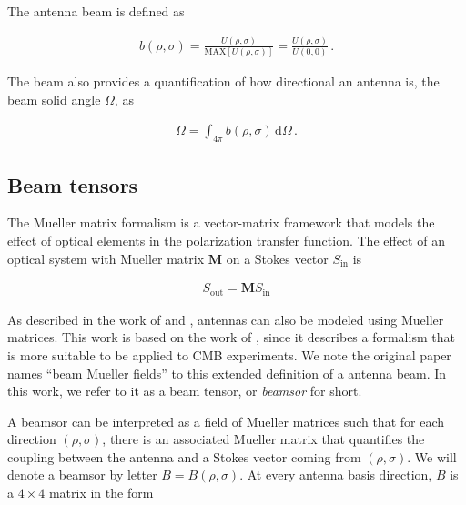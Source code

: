 \documentclass[a4paper,11pt]{article}
\begin{document}
\noindent
The antenna beam is defined as

\begin{equation}
\begin{aligned}
b(\rho, \sigma) = \frac{ U(\rho, \sigma) }{ \mathrm{MAX}\left[ U(\rho,\sigma) \right] }  =  \frac{ U(\rho, \sigma) }{ U(0,0) } \, .
\end{aligned}
\label{eq::beam_def}
\end{equation}

\noindent
The beam also provides a quantification of how directional an antenna is, the beam solid angle $\Omega$, as

\begin{equation}
\begin{aligned}
\Omega = \int_{4\pi} b(\rho,\sigma) \, \mathrm{d} \Omega \, .
\end{aligned}
\label{eq::omega_def}
\end{equation}

\subsection{Beam tensors}

The Mueller matrix formalism is a vector-matrix framework that models the effect of optical elements in the polarization transfer function. The effect of an optical system with Mueller matrix $\mathbf{M}$ on a Stokes vector $S_{\mathrm{in}}$ is 

\begin{equation}
\begin{aligned}
S_{\mathrm{out}} = \mathbf{M} S_{\mathrm{in}}
\end{aligned}
\end{equation}

\noindent
As described in the work of \cite{piepmeier_long_njoku_2008} and \cite{2007MNRAS.376.1767O}, antennas can also be modeled using Mueller matrices. This work is based on the work of \cite{2007MNRAS.376.1767O}, since it describes a formalism that is more suitable to be applied to CMB experiments. We note the original paper names ``beam Mueller fields'' to this extended definition of a antenna beam. In this work, we refer to it as a beam tensor, or \textsl{beamsor} for short.

A beamsor can be interpreted as a field of Mueller matrices such that for each direction $(\rho,\sigma)$, there is an associated Mueller matrix that quantifies the coupling between the antenna and a Stokes vector coming from $(\rho,\sigma)$. We will denote a beamsor by letter $B = B(\rho,\sigma)$. At every antenna basis direction, $B$ is a $4\times4$ matrix in the form
\end{document}
